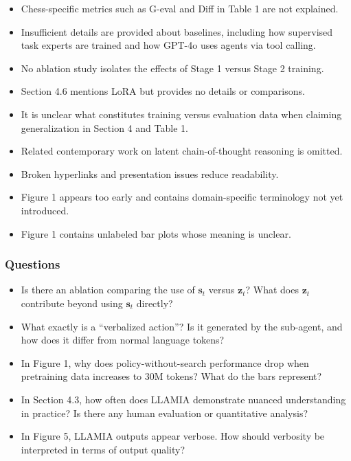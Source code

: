 \documentclass{article}
\theoremstyle{plain}
\theoremstyle{definition}
\theoremstyle{remark}
\begin{document}
\begin{itemize}
    \item Chess-specific metrics such as G-eval and Diff in Table 1 are not explained.
    \item Insufficient details are provided about baselines, including how supervised task experts are trained and how GPT-4o uses agents via tool calling.
    \item No ablation study isolates the effects of Stage 1 versus Stage 2 training.
    \item Section 4.6 mentions LoRA but provides no details or comparisons.
    \item It is unclear what constitutes training versus evaluation data when claiming generalization in Section 4 and Table 1.
    \item Related contemporary work on latent chain-of-thought reasoning is omitted.
    \item Broken hyperlinks and presentation issues reduce readability.
    \item Figure 1 appears too early and contains domain-specific terminology not yet introduced.
    \item Figure 1 contains unlabeled bar plots whose meaning is unclear.
\end{itemize}

\subsubsection*{Questions}

\begin{itemize}
    \item Is there an ablation comparing the use of $\mathbf{s}_t$ versus $\mathbf{z}_t$? What does $\mathbf{z}_t$ contribute beyond using $\mathbf{s}_t$ directly?
    \item What exactly is a ``verbalized action''? Is it generated by the sub-agent, and how does it differ from normal language tokens?
    \item In Figure 1, why does policy-without-search performance drop when pretraining data increases to 30M tokens? What do the bars represent?
    \item In Section 4.3, how often does LLAMIA demonstrate nuanced understanding in practice? Is there any human evaluation or quantitative analysis?
    \item In Figure 5, LLAMIA outputs appear verbose. How should verbosity be interpreted in terms of output quality?
\end{itemize}
\end{document}

